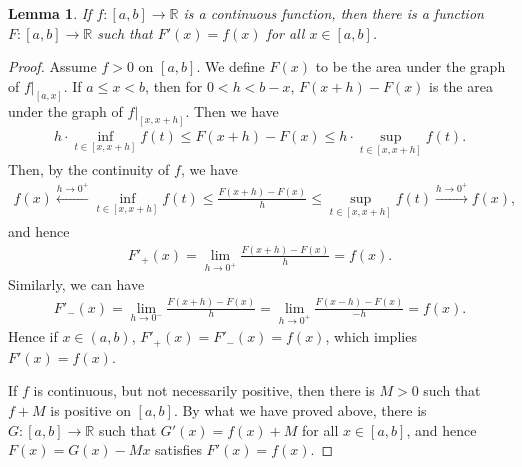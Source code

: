 \documentclass[11pt]{book}
\newtheorem{lemma}{Lemma}[chapter]
\theoremstyle{definition}
\numberwithin{equation}{chapter}
\begin{document}
\begin{lemma}\label{lemma_51}
If $f: [a,b] \to \mathbb{R}$ is a continuous function, then there is a function $F: [a,b] \to \mathbb{R}$ such that $F'(x) = f(x)$ for all $x \in [a,b]$.
\end{lemma}
\begin{proof}
Assume $f > 0$ on $[a,b]$. We define $F(x)$ to be the area under the graph of $f|_{[a,x]}$. If $a \leq x < b$, then for $0 < h < b - x$, $F(x+h) - F(x)$ is the area under the graph of $f|_{[x,x+h]}$. Then we have
\begin{align*}
    h \cdot \inf_{t \in [x,x+h]} f(t) \leq F(x+h) - F(x) \leq h \cdot \sup_{t \in [x,x+h]} f(t).
\end{align*} 
Then, by the continuity of $f$, we have
\begin{align*}
    f(x) \xleftarrow[]{h \to 0^+} \inf_{t \in [x,x+h]} f(t) \leq \frac{F(x+h) - F(x)}{h} \leq \sup_{t \in [x,x+h]} f(t) \xrightarrow[]{h \to 0^+} f(x),
\end{align*}
and hence
\begin{align*}
    F'_+(x) = \lim_{h \to 0^+} \frac{F(x+h) - F(x)}{h} = f(x).
\end{align*}
Similarly, we can have
\begin{align*}
    F'_-(x) = \lim_{h \to 0^-} \frac{F(x+h) - F(x)}{h} = \lim_{h \to 0^+} \frac{F(x-h) - F(x)}{-h} = f(x).
\end{align*}
Hence if $x \in (a,b)$, $F'_+(x) = F'_-(x) = f(x)$, which implies $F'(x) = f(x)$. 

If $f$ is continuous, but not necessarily positive, then there is $M > 0$ such that $f + M$ is positive on $[a,b]$. By what we have proved above, there is $G: [a,b] \to \mathbb{R}$ such that $G'(x) = f(x) + M$ for all $x \in [a,b]$, and hence $F(x) = G(x) - Mx$ satisfies $F'(x) = f(x)$.
\end{proof}

\medskip
\end{document}
